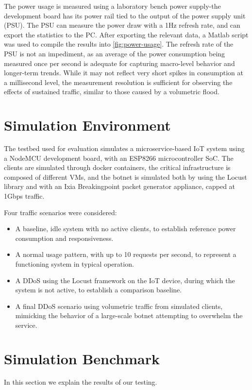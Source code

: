 The power usage is measured using a laboratory bench power supply-the development board has its power rail tied to the output of the power supply unit (PSU). The PSU can measure the power draw with a 1Hz refresh rate, and can export the statistics to the PC. After exporting the relevant data, a Matlab script was used to compile the results into \autoref{fig:power-usage}. The refresh rate of the PSU is not an impediment, as an average of the power consumption being measured once per second is adequate for capturing macro-level behavior and longer-term trends. While it may not reflect very short spikes in consumption at a millisecond level, the measurement resolution is sufficient for observing the effects of sustained traffic, similar to those caused by a volumetric flood.

\section{Simulation Environment}
The testbed used for evaluation simulates a microservice-based IoT system using a NodeMCU development board, with an ESP8266 microcontroller SoC. The clients are simulated through docker containers, the critical infrastructure is composed of different VMs, and the botnet is simulated both by using the Locust library and with an Ixia Breakingpoint packet generator appliance, capped at 1Gbps traffic.

Four traffic scenarios were considered:

\begin{itemize}
    \setlength\itemsep{1pt}
    \setlength\topsep{1pt}
    \setlength\parsep{1pt}
    \setlength\parskip{1pt}
    \item A baseline, idle system with no active clients, to establish reference power consumption and responsiveness.
    \item A normal usage pattern, with up to 10 requests per second, to represent a functioning system in typical operation.
    \item A DDoS using the Locust framework on the IoT device, during which the system is not active, to establish a comparison baseline.
    \item A final DDoS scenario using volumetric traffic from simulated clients, mimicking the behavior of a large-scale botnet attempting to overwhelm the service.
\end{itemize}

\section{Simulation Benchmark}
In this section we explain the results of our testing.

